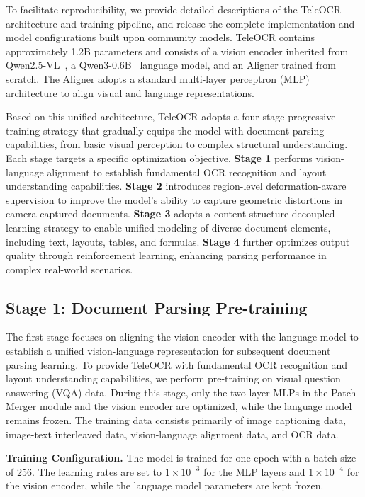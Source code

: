 \documentclass{fairmeta}
\begin{document}
To facilitate reproducibility, we provide detailed descriptions of the TeleOCR architecture and training pipeline, and release the complete implementation and model configurations built upon community models. TeleOCR contains approximately 1.2B parameters and consists of a vision encoder inherited from Qwen2.5-VL~\cite{bai2025qwen25vltechnicalreport}, a Qwen3-0.6B~\cite{yang2025qwen3} language model, and an Aligner trained from scratch. The Aligner adopts a standard multi-layer perceptron (MLP) architecture to align visual and language representations.

Based on this unified architecture, TeleOCR adopts a four-stage progressive training strategy that gradually equips the model with document parsing capabilities, from basic visual perception to complex structural understanding. Each stage targets a specific optimization objective. \textbf{Stage 1} performs vision-language alignment to establish fundamental OCR recognition and layout understanding capabilities. \textbf{Stage 2} introduces region-level deformation-aware supervision to improve the model's ability to capture geometric distortions in camera-captured documents. \textbf{Stage 3} adopts a content-structure decoupled learning strategy to enable unified modeling of diverse document elements, including text, layouts, tables, and formulas. \textbf{Stage 4} further optimizes output quality through reinforcement learning, enhancing parsing performance in complex real-world scenarios.


\subsection{Stage 1: Document Parsing Pre-training}
The first stage focuses on aligning the vision encoder with the language model to establish a unified vision-language representation for subsequent document parsing learning. To provide TeleOCR with fundamental OCR recognition and layout understanding capabilities, we perform pre-training on visual question answering (VQA) data. During this stage, only the two-layer MLPs in the Patch Merger module and the vision encoder are optimized, while the language model remains frozen. The training data consists primarily of image captioning data, image-text interleaved data, vision-language alignment data, and OCR data.

\textbf{Training Configuration.} The model is trained for one epoch with a batch size of 256. The learning rates are set to $1\times10^{-3}$ for the MLP layers and $1\times10^{-4}$ for the vision encoder, while the language model parameters are kept frozen.
\end{document}
